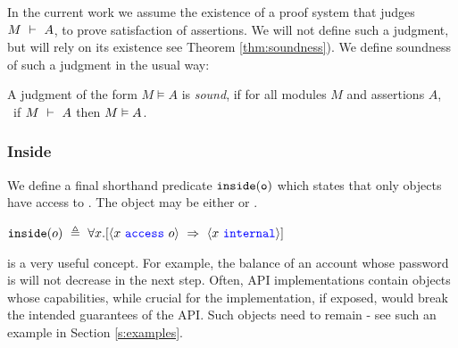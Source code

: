  
In the current work we assume the existence of a proof system that judges
$M\ \vdash\ A$, to prove  satisfaction of assertions. 
 We will not define such a judgment, but will rely on its existence see Theorem \ref{thm:soundness}).
We define soundness of such a judgment in the usual way:

\begin{definition}
\label{ax:specW-prove-soundness}
A judgment of the form $M \vDash A$ is \emph{sound}, if for all
 modules $M$ and assertions $A$, \ if $M\ \vdash\ A$ then $M \vDash A$.
\end{definition}

 
\subsubsection{Inside}

We define
a final shorthand 
predicate $\texttt{inside}( {\texttt{o}} )$ which states 
that only \internalO objects have access to .
The object  may be either \internalO or \externalO.
\begin{definition}[Inside]
$\wrapped{o}\ \triangleq\ \all{x}{\access{x}{o}\ \Rightarrow\ \internal{x}} $ 
\end{definition}

 
\inside is a very useful concept. For example, the balance of an account whose
  password is \inside  will not decrease in the next step.
  Often, API implementations contain objects whose capabilities, while  crucial for the implementation, if exposed,
would break the intended guarantees of the API. Such objects need to remain \inside - see
such an example in Section \ref{s:examples}. 
 
